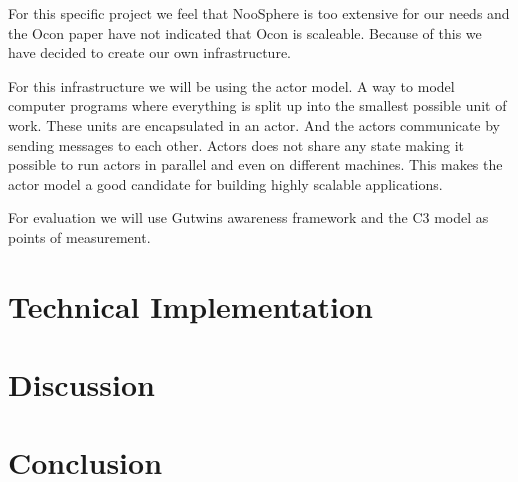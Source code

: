 \documentclass{sigchi}
\begin{document}
For this specific project we feel that NooSphere is too extensive for our needs and the Ocon paper have not indicated that Ocon is scaleable. Because of this we have decided to create our own infrastructure.

For this infrastructure we will be using the actor model. A way to model computer programs where everything is split up into the smallest possible unit of work. These units are encapsulated in an actor. And the actors communicate by sending messages to each other.
Actors does not share any state making it possible to run actors in parallel and even on different machines. This makes the actor model a good candidate for building highly scalable applications. 

For evaluation we will use Gutwins awareness framework and the C3 model as points of measurement.  


\section{Technical Implementation}


\section{Discussion}

\section{Conclusion}

\balance



\end{document}
